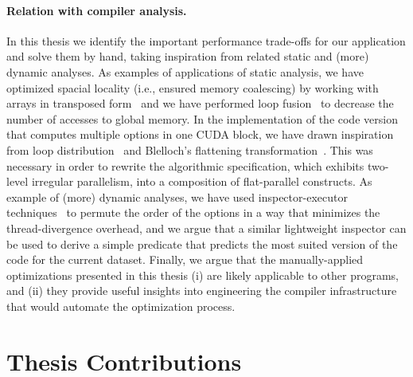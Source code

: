 \paragraph{Relation with compiler analysis.} In this thesis we identify the important performance trade-offs for our application and solve them by hand, taking inspiration from related static and (more) dynamic analyses.  As examples of applications of static analysis, we have optimized spacial locality (i.e., ensured memory coalescing) by working with arrays in transposed form~\cite{LexiFiPricing} and we have performed loop fusion~\cite{PolyhedralOpt} to decrease the number of accesses to global memory. In the implementation of the code version that computes multiple options in one CUDA block, we have drawn inspiration from loop distribution~\cite{PolyhedralOpt} and Blelloch's flattening transformation~\cite{blelloch1994implementation}. This was necessary in order to rewrite the algorithmic specification, which exhibits two-level irregular parallelism, into a composition of flat-parallel constructs.  
%
As example of (more) dynamic analyses, we have used inspector-executor techniques~\cite{Strout:DataItReord,SummaryMonot} to permute the order of the options in a way that minimizes the thread-divergence overhead, and we argue that a similar lightweight inspector can be used to derive a simple predicate that predicts the most suited version of the code for the current dataset.
%
Finally, we argue that the manually-applied optimizations presented in this thesis (i) are likely applicable to other programs, and (ii) they provide useful insights into engineering the compiler infrastructure that would automate the optimization process.


\newpage
\section{Thesis Contributions}
\label{section:thesiscontributions}
